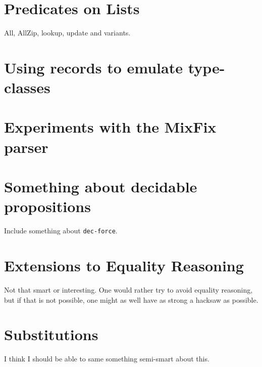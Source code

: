 
\section{Predicates on Lists}

All, AllZip, lookup, update and variants.

\section{Using records to emulate type-classes}

\section{Experiments with the MixFix parser}

\section{Something about decidable propositions}
Include something about \texttt{dec-force}.

\section{Extensions to Equality Reasoning}
Not that smart or interesting. One would rather try to avoid equality reasoning,
but if that is not possible, one might as well have as strong a hacksaw as
possible.


\section{Substitutions}
I think I should be able to same something semi-smart about this.

